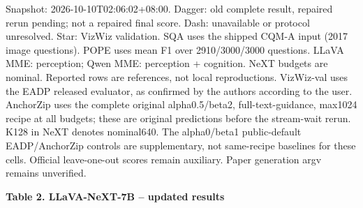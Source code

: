 \documentclass[10pt,a4paper]{article}
\begin{document}
{\footnotesize Snapshot: 2026-10-10T02:06:02+08:00. Dagger: old complete result, repaired rerun pending; not a repaired final score. Dash: unavailable or protocol unresolved. Star: VizWiz validation. SQA uses the shipped CQM-A input (2017 image questions). POPE uses mean F1 over 2910/3000/3000 questions. LLaVA MME: perception; Qwen MME: perception + cognition. NeXT budgets are nominal. Reported rows are references, not local reproductions. VizWiz-val uses the EADP released evaluator, as confirmed by the authors according to the user. AnchorZip uses the complete original alpha0.5/beta2, full-text-guidance, max1024 recipe at all budgets; these are original predictions before the stream-wait rerun. K128 in NeXT denotes nominal640. The alpha0/beta1 public-default EADP/AnchorZip controls are supplementary, not same-recipe baselines for these cells. Official leave-one-out scores remain auxiliary. Paper generation argv remains unverified.\par}
\newpage
{\large\textbf{Table 2. LLaVA-NeXT-7B -- updated results}}\par\medskip
\begingroup\setlength{\tabcolsep}{3.2pt}\renewcommand{\arraystretch}{1.03}
\end{document}
